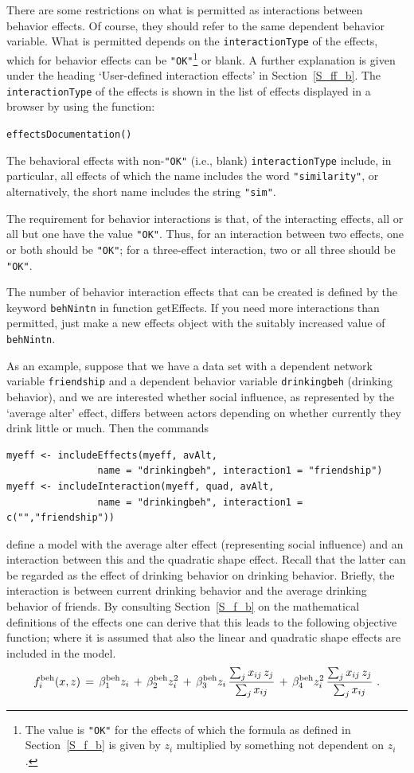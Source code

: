\documentclass[a4paper,fleqn,11pt]{article}
\newcommand{\+}{\, + \,}
\newcommand{\sfn}[1]{\textsf{#1}}
\begin{document}
There are some restrictions on what is permitted
as interactions between behavior effects.
Of course,  they should refer to the same dependent behavior variable.
What is permitted depends on the \texttt{interactionType} of the
effects, which for behavior effects can be \texttt{"OK"}\footnote{The value
is \texttt{"OK"} for the effects of which the
formula as defined in Section~\ref{S_f_b}
is given by $z_i$ multiplied by something not dependent on $z_i$.}
or blank.
A further explanation is given under the heading `User-defined interaction effects'
in Section~\ref{S_ff_b}.
The \texttt{interactionType} of the effects
is shown in the list of effects displayed in a browser by using the function:

\verb|effectsDocumentation()|
\bigskip

The behavioral effects with non-\texttt{"OK"} (i.e., blank)
\texttt{interactionType} include,
in particular, all effects of which the name
includes the word \texttt{"similarity"},
or alternatively, the short name includes the string \texttt{"sim"}.

The requirement for behavior interactions is that,
of the interacting effects, all or all but one have
the value \texttt{"OK"}. Thus, for an interaction between two effects,
one or both should be \texttt{"OK"}; for a three-effect interaction,
two or all three should be \texttt{"OK"}.

The number of behavior interaction effects that can be created is defined by the
keyword \texttt{behNintn} in function \sfn{getEffects}. If you need more
interactions than permitted, just make a new effects object with the
suitably increased value of \texttt{behNintn}.

As an example, suppose that we have a data set with a dependent
network variable \texttt{friendship} and a dependent behavior variable
\texttt{drinkingbeh} (drinking behavior), and we are interested whether
social influence, as represented by the `average alter' effect, differs
between actors depending on whether currently they drink little or much.
Then the commands
\begin{verbatim}
myeff <- includeEffects(myeff, avAlt,
                name = "drinkingbeh", interaction1 = "friendship")
myeff <- includeInteraction(myeff, quad, avAlt,
                name = "drinkingbeh", interaction1 = c("","friendship"))
\end{verbatim}
define a model with the average alter effect (representing social influence)
and an interaction between this and the quadratic shape effect.
Recall that the latter can be regarded
as the effect of drinking behavior on drinking behavior.
Briefly, the interaction is between current drinking behavior
and the average drinking behavior of friends.
By consulting Section~\ref{S_f_b} on the mathematical definitions of the
effects one can derive that this leads to the following objective function;
where it is assumed that also the linear and quadratic shape effects are
included in the model.
\[
f^{\rm beh}_i(x, z) \,=\, \beta^{\rm beh}_1 z_i \,+\, \beta^{\rm beh}_2 z_i^2
        \,+\, \beta^{\rm beh}_3 z_i \,
        \frac{ \sum_j x_{ij}\, z_j }{\sum_j x_{ij}}
       \,+\, \beta^{\rm beh}_4 z_i^2 \,
              \frac{ \sum_j x_{ij}\, z_j }{\sum_j x_{ij}} \ .
\]
\medskip
\end{document}
